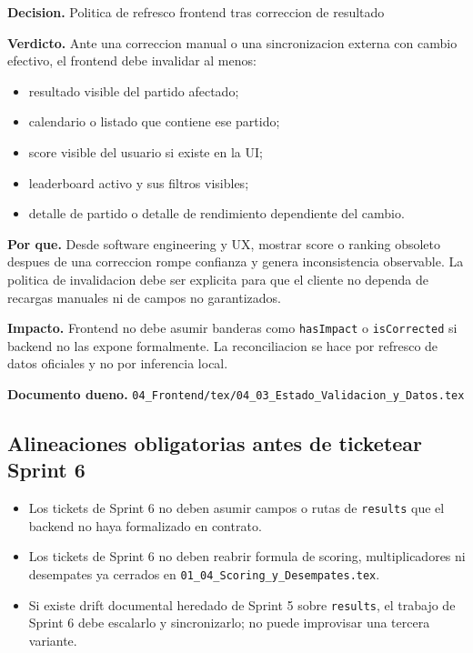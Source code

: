 \begin{docnote}
\textbf{Decision.} Politica de refresco frontend tras correccion de resultado

\textbf{Verdicto.} Ante una correccion manual o una sincronizacion externa con cambio efectivo, el frontend debe invalidar al menos:
\begin{itemize}
  \item resultado visible del partido afectado;
  \item calendario o listado que contiene ese partido;
  \item score visible del usuario si existe en la UI;
  \item leaderboard activo y sus filtros visibles;
  \item detalle de partido o detalle de rendimiento dependiente del cambio.
\end{itemize}

\textbf{Por que.} Desde software engineering y UX, mostrar score o ranking obsoleto despues de una correccion rompe confianza y genera inconsistencia observable. La politica de invalidacion debe ser explicita para que el cliente no dependa de recargas manuales ni de campos no garantizados.

\textbf{Impacto.} Frontend no debe asumir banderas como \texttt{hasImpact} o \texttt{isCorrected} si backend no las expone formalmente. La reconciliacion se hace por refresco de datos oficiales y no por inferencia local.

\textbf{Documento dueno.} \texttt{04\_Frontend/tex/04\_03\_Estado\_Validacion\_y\_Datos.tex}
\end{docnote}

\subsection{Alineaciones obligatorias antes de ticketear Sprint 6}

\begin{itemize}
  \item Los tickets de Sprint 6 no deben asumir campos o rutas de \texttt{results} que el backend no haya formalizado en contrato.
  \item Los tickets de Sprint 6 no deben reabrir formula de scoring, multiplicadores ni desempates ya cerrados en \texttt{01\_04\_Scoring\_y\_Desempates.tex}.
  \item Si existe drift documental heredado de Sprint 5 sobre \texttt{results}, el trabajo de Sprint 6 debe escalarlo y sincronizarlo; no puede improvisar una tercera variante.
\end{itemize}

